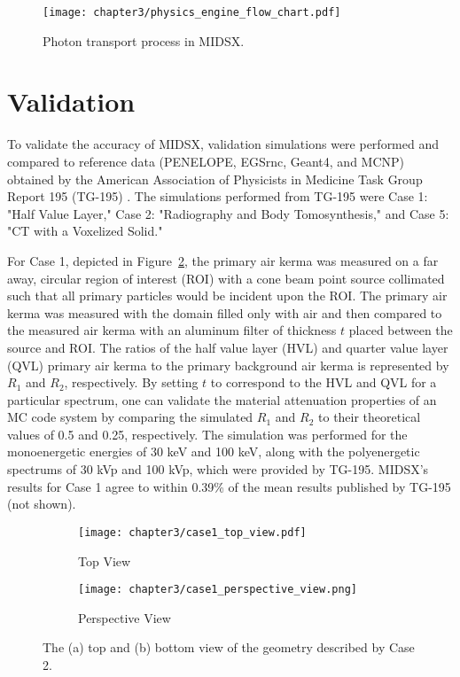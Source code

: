 \begin{figure}[H]
    \centering
	\texttt{[image: chapter3/physics\_engine\_flow\_chart.pdf]}
	\caption{Photon transport process in MIDSX.}
	\label{fig:PhysicsEngineFlowChart}
\end{figure}

\section{Validation}
\par To validate the accuracy of MIDSX, validation simulations were performed and compared to reference data (PENELOPE, EGSrnc, Geant4, and MCNP) obtained by the American Association of Physicists in Medicine Task Group Report 195 (TG-195) \cite{sechopoulos_monte_2015}. The simulations performed from TG-195 were Case 1: "Half Value Layer," Case 2: "Radiography and Body Tomosynthesis," and Case 5: "CT with a Voxelized Solid." 

\par For Case 1, depicted in Figure~\ref{fig:case1}, the primary air kerma was measured on a far away, circular region of interest (ROI) with a cone beam point source collimated such that all primary particles would be incident upon the ROI. The primary air kerma was measured with the domain filled only with air and then compared to the measured air kerma with an aluminum filter of thickness $t$ placed between the source and ROI. The ratios of the half value layer (HVL) and quarter value layer (QVL) primary air kerma to the primary background air kerma is represented by $R_1$ and $R_2$, respectively. By setting $t$ to correspond to the HVL and QVL for a particular spectrum, one can validate the material attenuation properties of an MC code system by comparing the simulated $R_1$ and $R_2$ to their theoretical values of 0.5 and 0.25, respectively. The simulation was performed for the monoenergetic energies of 30 keV and 100 keV, along with the polyenergetic spectrums of 30 kVp and 100 kVp, which were provided by TG-195. MIDSX's results for Case 1 agree to within 0.39\% of the mean results published by TG-195 (not shown).

\begin{figure}[H]
    \centering
    \begin{subfigure}[l]{\textwidth}
        \texttt{[image: chapter3/case1\_top\_view.pdf]}
        \caption{Top View}
    \end{subfigure}
    \hfill %
    \begin{subfigure}[l]{\textwidth}
        \texttt{[image: chapter3/case1\_perspective\_view.png]}
        \caption{Perspective View}
    \end{subfigure}
    \caption{The (a) top and (b) bottom view of the geometry described by Case 2.}
    \label{fig:case1}
\end{figure}

